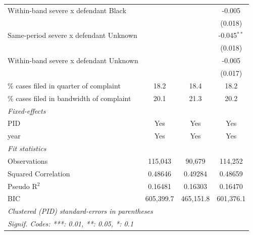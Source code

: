 \begin{tabular}{lccc}
   Within-band severe x defendant Black               &               &               & -0.005\\   
                                                      &               &               & (0.018)\\   
   Same-period severe x defendant Unknown             &               &               & -0.045$^{**}$\\   
                                                      &               &               & (0.018)\\   
   Within-band severe x defendant Unknown             &               &               & -0.005\\   
                                                      &               &               & (0.017)\\   
   \% cases filed in quarter of complaint             & 18.2          & 18.4          & 18.2\\  
   \% cases filed in bandwidth of complaint           & 20.1          & 21.3          & 20.2\\  
   \midrule
   \emph{Fixed-effects}\\
   PID                                                & Yes           & Yes           & Yes\\  
   year                                               & Yes           & Yes           & Yes\\  
   \midrule
   \emph{Fit statistics}\\
   Observations                                       & 115,043       & 90,679        & 114,252\\  
   Squared Correlation                                & 0.48646       & 0.49284       & 0.48659\\  
   Pseudo R$^2$                                       & 0.16481       & 0.16303       & 0.16470\\  
   BIC                                                & 605,399.7     & 465,151.8     & 601,376.1\\  
   \midrule \midrule
   \multicolumn{4}{l}{\emph{Clustered (PID) standard-errors in parentheses}}\\
   \multicolumn{4}{l}{\emph{Signif. Codes: ***: 0.01, **: 0.05, *: 0.1}}\\
\end{tabular}
\par\endgroup
